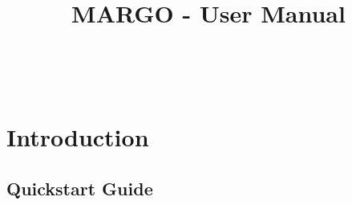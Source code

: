 \documentclass[11pt]{article}
\begin{document}
	
\renewcommand*\rmdefault{phv}
\selectfont
	
\title{MARGO - User Manual}
\maketitle

\newcommand{\avg}[1]{\left<{#1}\right>}
\newcommand{\hence}{\hspace{1cm}\Longrightarrow\hspace{1cm}}
\renewcommand{\ni}{\noindent}
\newcommand{\din}{\indent \indent}
\newcommand{\mni}{\medskip \noindent}
\newcommand{\bni}{\bigskip \noindent}
\newcommand{\sni}{\smallskip \noindent}
\newcommand{\pr}{{\rm Prob}}
\newcommand{\mon}{\begin{displaymath}}
\newcommand{\moff}{\end{displaymath}}
\newcommand{\sumi}[1]{\sum_{{#1}=-\infty}^{\infty}}
\renewcommand{\b}[1]{\mbox{\boldmath ${#1}$}}
\newcommand{\sumy}{\sum_{\b{y}}}
\newcommand{\sumz}{\sum_{\b{z}}}
\newcommand{\pd}[2]{\frac{\partial {#1}}{\partial {#2}}}
\newcommand{\od}[2]{\frac{d {#1}}{d {#2}}}
\newcommand{\odat}[3]{\left. \frac{d {#1}}{d {#2}} \right|_{#3}}
\newcommand{\inti}{\int_{-\infty}^{\infty}}
\newcommand{\eon}{\begin{equation}}
\newcommand{\eoff}{\end{equation}}
\newcommand{\eaon}{\begin{eqnarray}}
\newcommand{\eaoff}{\end{eqnarray}}
\newcommand{\e}[1]{\times 10^{#1}}
\newcommand{\chem}[2]{{}^{#2} \mathrm{#1}}
\renewcommand{\sb}{s}
\newcommand{\s}{s}
\newcommand{\zetaexp}{\left( \zeta e^{q \s t} \right)}
\newcommand{\taunuc}{\tau_{nuc}}
\newcommand{\eq}[1]{Eq. (\ref{#1})}\
\newcommand{\ev}[1]{\langle #1 \rangle}
\newcommand*\mean[1]{${\bar{#1}}$}

\cleardoublepage


\tableofcontents

\newpage
\section{Introduction}

\subsection{Quickstart Guide}
\end{document}
